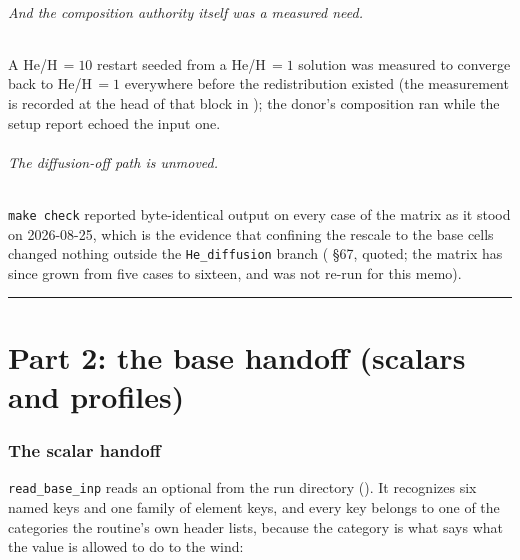 \documentclass[english,a4paper]{my_memo}
\begin{document}
\paragraph{And the composition authority itself was a measured need.} A
He/H\,$=10$ restart seeded from a He/H\,$=1$ solution was measured to
converge back to He/H\,$=1$ everywhere before the redistribution existed
(the measurement is recorded at the head of that block in
); the donor's composition ran while the setup report
echoed the input one.

\paragraph{The diffusion-off path is unmoved.} \verb|make check| reported
byte-identical output on every case of the matrix as it stood on 2026-08-25,
which is the evidence that confining the rescale to the base cells changed
nothing outside the \verb|He_diffusion| branch
( \S67, quoted; the matrix has since grown
from five cases to sixteen, and was not re-run for this memo).

\bigskip
\hrule

\part*{Part 2: the base handoff (scalars and profiles)}

\section{The scalar handoff}
\label{sec:scalars}

\verb|read_base_inp| reads an optional  from the run
directory (). It
recognizes six named keys and one family of element keys, and every key
belongs to one of the categories the routine's own header lists, because the
category is what says what the value is allowed to do to the wind:
\end{document}

